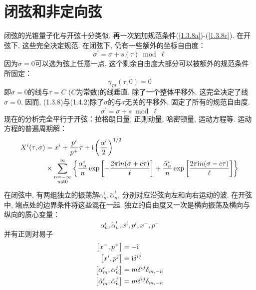 \section{\texorpdfstring{闭弦和非定向弦}{1.4 Closed and unoriented strings}} \label{sec:1.4}
闭弦的光锥量子化与开弦十分类似. 再一次施加规范条件(\ref{1.3.8a})-(\ref{1.3.8c}). 在开弦下, 这些完全决定规范. 在闭弦下, 仍有一些额外的坐标自由度：
\begin{equation}
\sigma^{\prime}=\sigma+s(\tau) \bmod \ell
\end{equation}
因为$\sigma=0$可以选为弦上任意一点, 这个剩余自由度大部分可以被额外的规范条件所固定：
\begin{equation}
\gamma_{\tau \sigma}(\tau, 0)=0
\end{equation}
即$\sigma=0$的线与$\tau=C$ ($C$为常数)的线垂直. 除了一个整体平移外, 这完全决定了线$\sigma=0$. 因而, (1.3.8)与(1.4.2)除了$\sigma$的与$\tau$无关的平移外, 固定了所有的规范自由度. 
\begin{equation}
\sigma^{\prime}=\sigma+s \bmod \ell   \label{sigma-translation}
\end{equation}
现在的分析完全平行于开弦：拉格朗日量, 正则动量, 哈密顿量, 运动方程等. 运动方程的普遍周期解：
\begin{equation}
\begin{aligned}
X^{i}(\tau, \sigma) &=x^{i}+\frac{p^{i}}{p^{+}} \tau+\mathrm{i}\left(\frac{\alpha^{\prime}}{2}\right)^{1 / 2} \\
& \times \sum_{\substack{n=-\infty  \\  n \neq 0}}^{\infty}\left\{\frac{\alpha_{n}^{i}}{n} \exp \left[-\frac{2 \pi \mathrm{i} n(\sigma+c \tau)}{\ell}\right]+\frac{\tilde{\alpha}_{n}^{i}}{n} \exp \left[\frac{2 \pi \mathrm{i} n(\sigma-c \tau)}{\ell}\right]\right\} \label{general-periodic-solution}
\end{aligned}
\end{equation}
在闭弦中, 有两组独立的振荡解$\alpha_{n}^{i}, \tilde{\alpha}_{n}^{i}$, 分别对应沿弦向左和向右运动的波. 在开弦中, 端点处的边界条件将这些混在一起. 独立的自由度又一次是横向振荡及横向与纵向的质心变量：
\begin{equation}
\alpha_{n}^{i}, \tilde{\alpha}_{n}^{i}, x^{i}, p^{i}, x^{-}, p^{+}
\end{equation}
并有正则对易子
\begin{subequations}
\begin{align}
\left[x^{-}, p^{+}\right]&=-\mathrm{i} \\
\left[x^{i}, p^{j}\right]&=\mathrm{i} \delta^{i j} \\
\left[\alpha_{m}^{i}, \alpha_{n}^{j}\right]&=m \delta^{i j} \delta_{m,-n} \\
\left[\tilde{\alpha}_{m}^{i}, \tilde{\alpha}_{n}^{j}\right]&=m \delta^{i j} \delta_{m,-n} 
\end{align}
\end{subequations}
